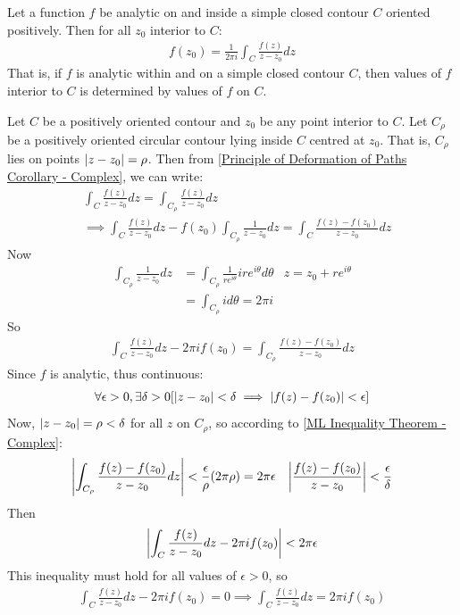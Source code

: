 \documentclass[12pt, english]{book}
\makeatletter
\renewenvironment{proof}[1][\proofname]{\par
	\pushQED{\qed}%
	\normalfont \topsep6\p@\@plus6\p@\relax
	\list{}{%
		\settowidth{\leftmargin}{\itshape\proofname:\hskip\labelsep}%
		\setlength{\labelwidth}{0pt}%
		\setlength{\itemindent}{-\leftmargin}%
	}%
	\item[\hskip\labelsep\itshape#1\@addpunct{:}]\ignorespaces
	}{ \popQED\endlist\@endpefalse}
\makeatother
\begin{document}
	\begin{theorem}
		\label{Cauchy Integral Formula}
		Let a function \(f\) be analytic on and inside a simple closed contour \(C\) oriented positively. Then for all \(z_0\) interior to \(C\):
		\begin{align*}
			f(z_0) = \frac{1}{2\pi i} \int_{C} \frac{f(z)}{z - z_0} dz
		\end{align*}
		That is, if \(f\) is analytic within and on a simple closed contour \(C\), then values of \(f\) interior to \(C\) is determined by values of \(f\) on \(C\).
	\end{theorem}
	\begin{proof}
		Let  \(C\) be a positively oriented contour and \(z_0\) be any point interior to \(C\). Let \(C_\rho\) be a positively oriented circular contour lying inside \(C\) centred at \(z_0\). That is, \(C_\rho\) lies on points \(\abs{z - z_0} = \rho\). Then from \cref{Principle of Deformation of Paths Corollary - Complex}, we can write: 
		\begin{align*}
			&\int_{C} \frac{f(z)}{z-z_0} dz = \int_{C_\rho} \frac{f(z)}{z-z_0} dz  \\
			&\implies \int_{C} \frac{f(z)}{z-z_0} dz - f(z_0) \int_{C_\rho} \frac{1}{z-z_0} dz = \int_{C} \frac{f(z) - f(z_0)}{z-z_0} dz 
		\end{align*}
		Now
		\begin{align*}
			\int_{C_\rho} \frac{1}{z-z_0} dz 
			&= \int_{C_\rho} \frac{1}{re^{i\theta}} ire^{i\theta} d\theta & z = z_0 + re^{i\theta} \\
			&= \int_{C_\rho} i d\theta = 2\pi i
		\end{align*}
		So
		\begin{align*}
			\int_{C} \frac{f(z)}{z - z_0}dz - 2\pi i f(z_0) = \int_{C_\rho} \frac{f(z) - f(z_0)}{z - z_0} dz
		\end{align*}
		Since \(f\) is analytic, thus continuous:
		\begin{align*}
			\forall \epsilon>0, \exists \delta>0 [\abs{z-z_0}<\delta \implies \abs{f(z) - f(z_0)}<\epsilon]
		\end{align*}
		Now, \(\abs{z - z_0} = \rho < \delta\) for all \(z\) on \(C_\rho\), so according to \cref{ML Inequality Theorem - Complex}:
		\begin{align*}
			\abs{\int_{C_\rho} \frac{f(z) - f(z_0)}{z - z_0} dz} &< \frac{\epsilon}{\rho} (2 \pi \rho) = 2 \pi \epsilon & \abs{\frac{f(z) - f(z_0)}{z - z_0}} < \frac{\epsilon}{\delta}
		\end{align*}
		Then
		\begin{align*}
			\abs{\int_{C} \frac{f(z)}{z - z_0}dz - 2\pi i f(z_0)} < 2 \pi \epsilon
		\end{align*}
		This inequality must hold for all values of \(\epsilon > 0\), so
		\begin{align*}
			\int_{C} \frac{f(z)}{z - z_0}dz - 2\pi i f(z_0) = 0 \implies \int_{C} \frac{f(z)}{z - z_0} dz = 2 \pi i f(z_0)
		\end{align*}
	\end{proof}
	
\end{document}

